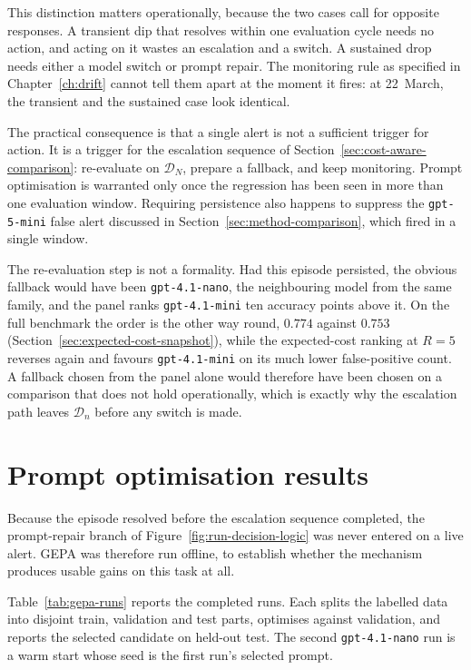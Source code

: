This distinction matters operationally, because the two cases call for opposite responses. A transient dip that resolves within one evaluation cycle needs no action, and acting on it wastes an escalation and a switch. A sustained drop needs either a model switch or prompt repair. The monitoring rule as specified in Chapter~\ref{ch:drift} cannot tell them apart at the moment it fires: at 22~March, the transient and the sustained case look identical.

The practical consequence is that a single alert is not a sufficient trigger for action. It is a trigger for the escalation sequence of Section~\ref{sec:cost-aware-comparison}: re-evaluate on $\mathcal{D}_N$, prepare a fallback, and keep monitoring. Prompt optimisation is warranted only once the regression has been seen in more than one evaluation window. Requiring persistence also happens to suppress the \texttt{gpt-5-mini} false alert discussed in Section~\ref{sec:method-comparison}, which fired in a single window.

The re-evaluation step is not a formality. Had this episode persisted, the obvious fallback would have been \texttt{gpt-4.1-nano}, the neighbouring model from the same family, and the panel ranks \texttt{gpt-4.1-mini} ten accuracy points above it. On the full benchmark the order is the other way round, $0.774$ against $0.753$ (Section~\ref{sec:expected-cost-snapshot}), while the expected-cost ranking at $R=5$ reverses again and favours \texttt{gpt-4.1-mini} on its much lower false-positive count. A fallback chosen from the panel alone would therefore have been chosen on a comparison that does not hold operationally, which is exactly why the escalation path leaves $\mathcal{D}_n$ before any switch is made.

\section{Prompt optimisation results}
\label{sec:prompt-optimisation-results}

Because the episode resolved before the escalation sequence completed, the prompt-repair branch of Figure~\ref{fig:run-decision-logic} was never entered on a live alert. GEPA was therefore run offline, to establish whether the mechanism produces usable gains on this task at all.

Table~\ref{tab:gepa-runs} reports the completed runs. Each splits the labelled data into disjoint train, validation and test parts, optimises against validation, and reports the selected candidate on held-out test. The second \texttt{gpt-4.1-nano} run is a warm start whose seed is the first run's selected prompt.

